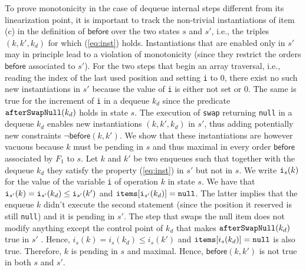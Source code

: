 To prove monotonicity in the case of dequeue internal steps different from its linearization point, it is important to track the non-trivial instantiations of item (c) in the definition of $\mathsf{before}$ over the two states $s$ and $s'$, i.e., the triples $(k,k',k_d)$ for which (\ref{eq:inst}) holds. Instantiations that are enabled only in $s'$ may in principle lead to a violation of monotonicity (since they restrict the orders $\mathsf{before}$ associated to $s'$). For the two steps that begin an array traversal, i.e., reading the index of the last used position and setting {\tt i} to $0$, there exist no  such new instantiations in $s'$ because the value of {\tt i} is either not set or $0$. %
%
%
%
%
The same is true for the increment of {\tt i} in a dequeue $k_d$ since the predicate ${\tt afterSwapNull}(k_d)$ holds in state $s$.
The execution of {\tt swap} returning {\tt null} in a dequeue $k_d$ enables new instantiations $(k,k',k_d)$ in $s'$, thus adding potentially new constraints $\neg \mathsf{before}(k,k')$. We show that these instantiations are however vacuous because $k$ must be pending in $s$ and thus maximal in every order $\mathsf{before}$ associated by $F_1$ to $s$.
Let $k$ and $k'$ be two enqueues such that together with the dequeue $k_d$ they satisfy the property (\ref{eq:inst}) in $s'$ but not in $s$.
We write ${\tt i}_s(k)$ for the value of the variable {\tt i} of operation $k$ in state $s$.
We have that ${\tt i}_{s'}(k) = {\tt i}_{s'}(k_d) \leq {\tt i}_{s'}(k')$ and ${\tt items}[{\tt i}_{s'}(k_d)]={\tt null}$. The latter implies that the enqueue $k$ didn't execute
the second statement (since the position it reserved is still {\tt null}) and it is pending in $s'$. The step that swaps the null item does not modify anything except the control point of $k_d$ that makes ${\tt afterSwapNull}(k_d)$ true in $s'$ . Hence, $i_s(k) = i_s(k_d)\leq i_s(k')$ and ${\tt items}[i_s(k_d)] = {\tt null}$ is also true. Therefore, $k$ is pending in $s$ and maximal. Hence, $\mathsf{before}(k,k')$ is not true in both $s$ and $s'$.

